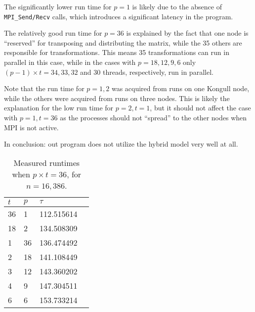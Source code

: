The significantly lower run time for $p=1$ is likely due to the absence of \texttt{MPI\_Send/Recv} calls, which introduces a significant latency in the program.

The relatively good run time for $p=36$ is explained by the fact that one node is ``reserved'' for transposing and distributing the matrix, while the 35 others are responsible for transformations. This means 35 transformations can run in parallel in this case, while in the cases with $p=18,12,9,6$ only $(p-1)\times t = 34, 33, 32$ and $30$ threads, respectively, run in parallel.

Note that the run time for $p=1,2$ was acquired from runs on one Kongull node, while the others were acquired from runs on three nodes. This is likely the explanation for the low run time for $p=2, t=1$, but it should not affect the case with $p=1,t=36$ as the processes should not ``spread'' to the other nodes when MPI is not active.

In conclusion: out program does not utilize the hybrid model very well at all.

\begin{table}[H]
  \centering
  \caption{Measured runtimes when $p\times t = 36$, for $n=16,386$.}
  \label{tab:runtimes_36}
  \begin{tabularx}{0.5\textwidth}{XXXX}
    \toprule
    $t$ & $p$ & $\tau$ \\
    \midrule
    36  &  1  &  112.515614 \\
    18  &  2  &  134.508309 \\
    1   & 36  &  136.474492 \\
    2   & 18  &  141.108449 \\
    3   & 12  &  143.360202 \\
    4   &  9  &  147.304511 \\
    6   &  6  &  153.733214 \\
    \bottomrule
  \end{tabularx}
\end{table}

